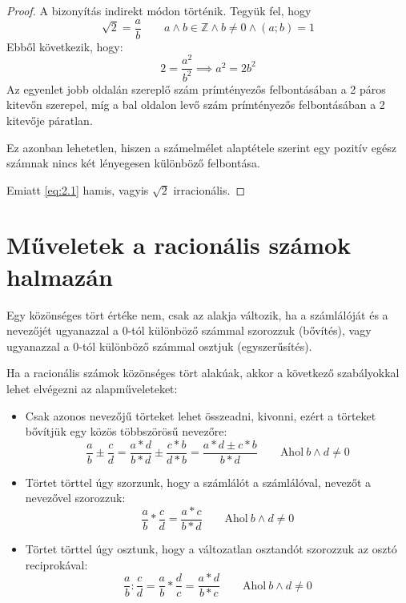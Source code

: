 \documentclass[twoside,12pt]{report}
\theoremstyle{definition}
\begin{document}
	\begin{proof}
		A bizonyítás indirekt módon történik. Tegyük fel, hogy 
		\begin{equation}\label{eq:2.1}
		\sqrt{2}=\frac{a}{b}\qquad a\wedge b\in\mathbb{Z}\wedge b\ne0\wedge(a;b)=1
		\end{equation}
		Ebből következik, hogy:
		\begin{equation}
			2=\frac{a^2}{b^2}\implies a^2=2b^2
		\end{equation}
		Az egyenlet jobb oldalán szereplő szám prímtényezős felbontásában a 2 páros kitevőn szerepel, míg a bal oldalon levő szám prímtényezős felbontásában a 2 kitevője páratlan.
		
		Ez azonban lehetetlen, hiszen a számelmélet alaptétele szerint egy pozitív egész számnak
		nincs két lényegesen különböző felbontása. 
		
		Emiatt \eqref{eq:2.1} hamis, vagyis $\sqrt{2}$ irracionális.
	\end{proof}
\section{Műveletek a racionális számok halmazán}
	Egy közönséges tört értéke nem, csak az alakja változik, ha a számlálóját és a nevezőjét ugyanazzal a 0-tól különböző számmal szorozzuk (bővítés), vagy ugyanazzal a 0-tól különböző számmal osztjuk (egyszerűsítés).
	
	Ha a racionális számok közönséges tört alakúak, akkor a következő szabályokkal lehet elvégezni az alapműveleteket:
	\begin{itemize}
		\item Csak azonos nevezőjű törteket lehet összeadni, kivonni, ezért a törteket bővítjük egy közös többszörösű nevezőre:
		\begin{equation*}
			\frac{a}{b}\pm\frac{c}{d}=\frac{a*d}{b*d}\pm\frac{c*b}{d*b}=\frac{a*d\pm c*b}{b*d}\qquad \text{Ahol}\ b\wedge d\ne0
		\end{equation*}
		\item Törtet törttel úgy szorzunk, hogy a számlálót a számlálóval, nevezőt a nevezővel szorozzuk:
		\begin{equation*}
		\frac{a}{b}*\frac{c}{d}=\frac{a*c}{b*d}\qquad \text{Ahol}\ b\wedge d\ne0
		\end{equation*}
		\item Törtet törttel úgy osztunk, hogy a változatlan osztandót szorozzuk az osztó reciprokával:
		\begin{equation*}
		\frac{a}{b}:\frac{c}{d}=\frac{a}{b}*\frac{d}{c}=\frac{a*d}{b*c}\qquad \text{Ahol}\ b\wedge d\ne0
		\end{equation*}
	\end{itemize}
\end{document}
